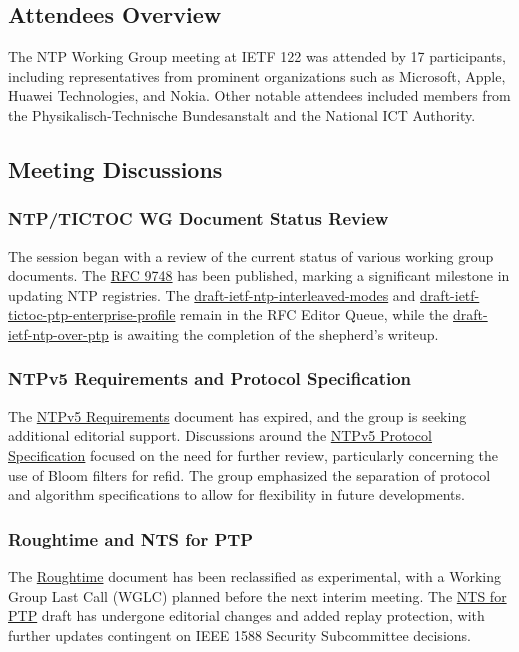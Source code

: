 \documentclass{article}
\begin{document}
\subsection{Attendees Overview}
The NTP Working Group meeting at IETF 122 was attended by 17 participants, including representatives from prominent organizations such as Microsoft, Apple, Huawei Technologies, and Nokia. Other notable attendees included members from the Physikalisch-Technische Bundesanstalt and the National ICT Authority.

\subsection{Meeting Discussions}

\subsubsection{NTP/TICTOC WG Document Status Review}
The session began with a review of the current status of various working group documents. The \href{https://datatracker.ietf.org/doc/html/rfc9748}{RFC 9748} has been published, marking a significant milestone in updating NTP registries. The \href{https://datatracker.ietf.org/doc/html/draft-ietf-ntp-interleaved-modes}{draft-ietf-ntp-interleaved-modes} and \href{https://datatracker.ietf.org/doc/html/draft-ietf-tictoc-ptp-enterprise-profile}{draft-ietf-tictoc-ptp-enterprise-profile} remain in the RFC Editor Queue, while the \href{https://datatracker.ietf.org/doc/html/draft-ietf-ntp-over-ptp}{draft-ietf-ntp-over-ptp} is awaiting the completion of the shepherd's writeup.

\subsubsection{NTPv5 Requirements and Protocol Specification}
The \href{https://datatracker.ietf.org/doc/html/draft-ietf-ntp-ntpv5-requirements}{NTPv5 Requirements} document has expired, and the group is seeking additional editorial support. Discussions around the \href{https://datatracker.ietf.org/doc/html/draft-ietf-ntp-ntpv5}{NTPv5 Protocol Specification} focused on the need for further review, particularly concerning the use of Bloom filters for refid. The group emphasized the separation of protocol and algorithm specifications to allow for flexibility in future developments.

\subsubsection{Roughtime and NTS for PTP}
The \href{https://datatracker.ietf.org/doc/html/draft-ietf-ntp-roughtime}{Roughtime} document has been reclassified as experimental, with a Working Group Last Call (WGLC) planned before the next interim meeting. The \href{https://datatracker.ietf.org/doc/html/draft-langer-ntp-nts-for-ptp}{NTS for PTP} draft has undergone editorial changes and added replay protection, with further updates contingent on IEEE 1588 Security Subcommittee decisions.
\end{document}
